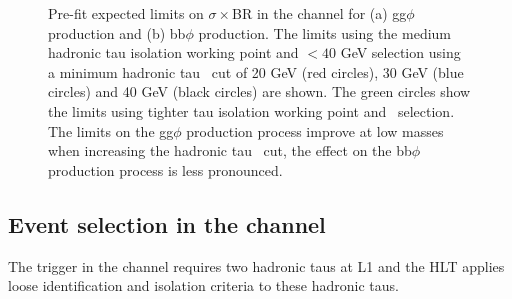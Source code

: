 \begin{figure}[h!]
\begin{center}
\end{center}
\caption[Pre-fit expected limits on $\sigma\times$BR in the \etau
channel for gg$\phi$ and bb$\phi$ production comparing different
hadronic tau isolation cuts.]{Pre-fit expected limits on $\sigma\times$BR in the \etau channel for (a) gg$\phi$ production and (b) bb$\phi$ production. The
limits using the medium hadronic tau isolation working point and \mT$<40$ GeV selection using a minimum
hadronic tau \pT~cut of 20 GeV (red circles), 30 GeV (blue circles) and 40 GeV (black circles) are shown. The green
circles show the limits using tighter tau isolation working point and \mT~selection. The limits on
the gg$\phi$ production process improve at low masses when increasing the hadronic tau \pT~cut,
the effect on the bb$\phi$ production process is less pronounced.}
\label{fig:mssm_tauptcut_et}
\end{figure}

\subsection{\texorpdfstring{Event selection in the \tautau channel}{Event selection in the tau tau channel}}
\label{sec:mssm_eventsel_tt}
The trigger in the \tautau channel requires two hadronic taus at \ac{L1} and the \ac{HLT}
applies loose identification and isolation criteria to these hadronic taus.

